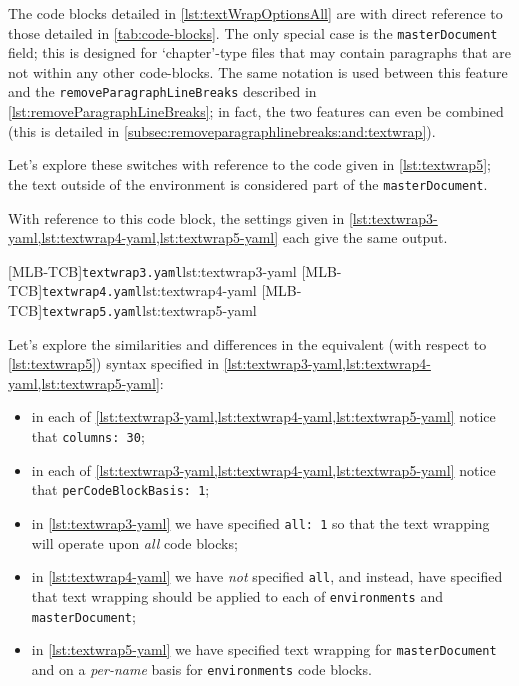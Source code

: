 	The code blocks detailed in \cref{lst:textWrapOptionsAll} are with direct reference to
	those detailed in \vref{tab:code-blocks}. The only special case is the
	\texttt{masterDocument} field; this is designed for `chapter'-type files that may
	contain paragraphs that are not within any other code-blocks. The same notation is used
	between this feature and the \texttt{removeParagraphLineBreaks} described in
	\vref{lst:removeParagraphLineBreaks}; in fact, the two features can even be combined (this is
	detailed in \vref{subsec:removeparagraphlinebreaks:and:textwrap}).

	Let's explore these switches with reference to the code given in
	\cref{lst:textwrap5}; the text outside of the environment is considered part of
	the \texttt{masterDocument}.

	\begin{widepage}
	\end{widepage}

	With reference to this code block, the settings given in \cref{lst:textwrap3-yaml,lst:textwrap4-yaml,lst:textwrap5-yaml} each
	give the same output.

	\begin{cmhtcbraster}[raster columns=3,
			raster left skip=-3.5cm,
			raster right skip=-2cm,
			raster column skip=.03\linewidth]
		[MLB-TCB]{\texttt{textwrap3.yaml}}{lst:textwrap3-yaml}
		[MLB-TCB]{\texttt{textwrap4.yaml}}{lst:textwrap4-yaml}
		[MLB-TCB]{\texttt{textwrap5.yaml}}{lst:textwrap5-yaml}
	\end{cmhtcbraster}

	Let's explore the similarities and differences in the equivalent (with respect to
	\cref{lst:textwrap5}) syntax specified in \cref{lst:textwrap3-yaml,lst:textwrap4-yaml,lst:textwrap5-yaml}:
	\begin{itemize}
		\item in each of \cref{lst:textwrap3-yaml,lst:textwrap4-yaml,lst:textwrap5-yaml} notice that \texttt{columns: 30};
		\item in each of \cref{lst:textwrap3-yaml,lst:textwrap4-yaml,lst:textwrap5-yaml} notice that \texttt{perCodeBlockBasis: 1};
		\item in \cref{lst:textwrap3-yaml} we have specified \texttt{all: 1} so that the
		      text wrapping will operate upon \emph{all} code blocks;
		\item in \cref{lst:textwrap4-yaml} we have \emph{not} specified
		      \texttt{all}, and instead, have specified that text wrapping should be
		      applied to each of \texttt{environments} and \texttt{masterDocument};
		\item in \cref{lst:textwrap5-yaml} we have specified text wrapping for
		      \texttt{masterDocument} and on a \emph{per-name} basis for
		      \texttt{environments} code blocks.
	\end{itemize}

